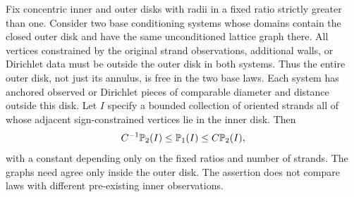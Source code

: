 \begin{lemma}\label{g:strand-comparison}
Fix concentric inner and outer disks with radii in a fixed ratio
strictly greater than one. Consider two base conditioning systems
whose domains contain the closed outer disk and have the same
unconditioned lattice graph there. All vertices constrained by the
original strand observations, additional walls, or Dirichlet data
must be outside the outer disk in both systems. Thus the entire outer
disk, not just its annulus, is free in the two base laws. Each system
has anchored observed or Dirichlet pieces of comparable diameter
and distance outside this disk. Let \(I\) specify a bounded collection
of oriented strands all of whose adjacent sign-constrained vertices
lie in the inner disk. Then
\[
 C^{-1}\mathbb P_2(I)\leq\mathbb P_1(I)\leq C\mathbb P_2(I),
\]
with a constant depending only on the fixed ratios and number of
strands. The graphs need agree only inside the outer disk.
The assertion does not compare laws with different pre-existing
inner observations.
\end{lemma}

